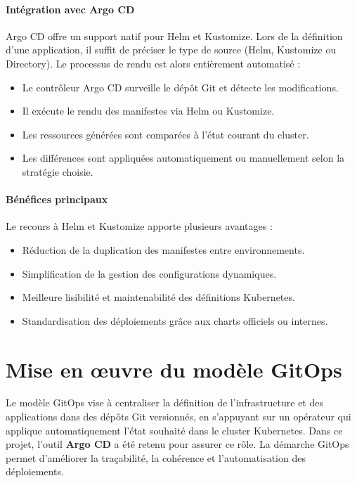 \paragraph{Intégration avec Argo CD}

Argo CD offre un support natif pour Helm et Kustomize. Lors de la définition d’une application, il suffit de préciser le type de source (Helm, Kustomize ou Directory). Le processus de rendu est alors entièrement automatisé :
\begin{itemize}
	\item Le contrôleur Argo CD surveille le dépôt Git et détecte les modifications.
	\item Il exécute le rendu des manifestes via Helm ou Kustomize.
	\item Les ressources générées sont comparées à l’état courant du cluster.
	\item Les différences sont appliquées automatiquement ou manuellement selon la stratégie choisie.
\end{itemize}

\paragraph{Bénéfices principaux}

Le recours à Helm et Kustomize apporte plusieurs avantages :
\begin{itemize}
	\item Réduction de la duplication des manifestes entre environnements.
	\item Simplification de la gestion des configurations dynamiques.
	\item Meilleure lisibilité et maintenabilité des définitions Kubernetes.
	\item Standardisation des déploiements grâce aux charts officiels ou internes.
\end{itemize}

\section{Mise en œuvre du modèle GitOps}

Le modèle GitOps vise à centraliser la définition de l’infrastructure et des applications dans des dépôts Git versionnés, en s’appuyant sur un opérateur qui applique automatiquement l’état souhaité dans le cluster Kubernetes.
Dans ce projet, l’outil \textbf{Argo CD} a été retenu pour assurer ce rôle.
La démarche GitOps permet d’améliorer la traçabilité, la cohérence et l’automatisation des déploiements.

